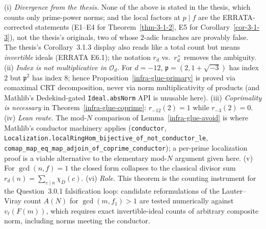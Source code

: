 \begin{remark}
  \label{infra-glue-remarks}
  (i) \emph{Divergence from the thesis.} None of the above is stated in the
  thesis, which counts only prime-power norms; and the local factors at
  $p \mid f$ are the ERRATA-corrected statements (E1--E4 for
  Theorem~\ref{thm-3-1-2}, E5 for Corollary~\ref{cor-3-1-3}), not the thesis's
  originals, two of whose $2$-adic branches are provably false. The thesis's
  Corollary~3.1.3 display also reads like a total count but means
  \emph{invertible} ideals (ERRATA E6.1); the notation $r_d$ vs.\
  $r_d^{\times}$ removes the ambiguity.
  (ii) \emph{Index is not multiplicative in $\mathcal{O}_d$.} For $d = -12$,
  $\mathfrak{p} = (2, 1 + \sqrt{-3})$ has index $2$ but $\mathfrak{p}^2$ has
  index $8$; hence Proposition~\ref{infra-glue-primary} is proved via comaximal
  CRT decomposition, never via norm multiplicativity of products (and Mathlib's
  Dedekind-gated \texttt{Ideal.absNorm} API is unusable here).
  (iii) \emph{Coprimality is necessary} in
  Theorem~\ref{infra-glue-coprime}: $r_{-12}(2) = 1$ while $r_{-3}(2) = 0$.
  (iv) \emph{Lean route.} The mod-$N$ comparison of
  Lemma~\ref{infra-glue-avoid} is where Mathlib's conductor machinery applies
  (\texttt{conductor},
  \texttt{Localization.localRingHom\_bijective\_of\_not\_conductor\_le},
  \texttt{comap\_map\_eq\_map\_adjoin\_of\_coprime\_conductor}); a per-prime
  localization proof is a viable alternative to the elementary mod-$N$
  argument given here.
  (v) For $\gcd(n, f) = 1$ the closed form collapses to the classical divisor
  sum $r_d(n) = \sum_{c \mid n} \chi_D(c)$.
  (vi) \emph{Role.} This theorem is the counting instrument for the
  Question~3.0.1 falsification loop: candidate reformulations of the
  Lauter--Viray count $A(N)$ for $\gcd(m, f_1) > 1$ are tested numerically
  against $v_\ell(F(m))$, which requires exact invertible-ideal counts of
  arbitrary composite norm, including norms meeting the conductor.
\end{remark}

